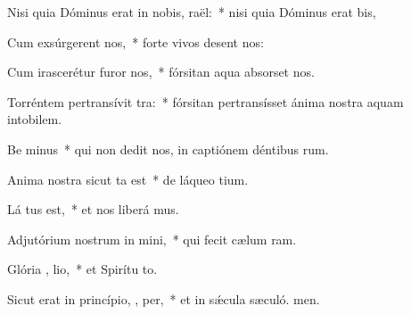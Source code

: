 \item Nisi quia Dóminus erat in nobis,   raël:~* nisi quia Dóminus erat  bis,
\item Cum exsúrgerent   nos,~* forte vivos desent nos:
\item Cum irascerétur furor   nos,~* fórsitan aqua absorset nos.
\item Torréntem pertransívit  tra:~* fórsitan pertransísset ánima nostra aquam intobilem.
\item Be minus~* qui non dedit nos, in captiónem déntibus rum.
\item Anima nostra sicut  ta est~* de láqueo tium.
\item Lá tus est,~* et nos liberá mus.
\item Adjutórium nostrum in  mini,~* qui fecit cælum  ram.
\item Glória ,  lio,~* et Spirítu to.
\item Sicut erat in princípio,  ,  per,~* et in sǽcula sæculó. men.
